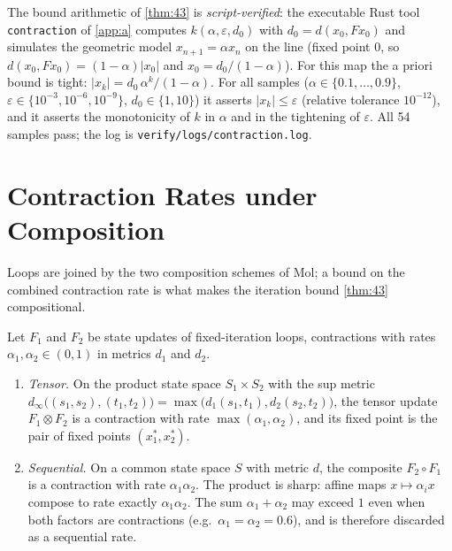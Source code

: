 \begin{remark}\label{rem:thm43-verified}
The bound arithmetic of \autoref{thm:43} is \emph{script-verified}: the executable Rust tool \texttt{contraction} of \autoref{app:a} computes $k (\alpha,\varepsilon,d_0)$ with $d_0 = d (x_0, F x_0)$ and simulates the geometric model $x_{n+1} = \alpha x_n$ on the line (fixed point $0$, so $d (x_0, F x_0) = (1-\alpha) \lvert x_0 \rvert$ and $x_0 = d_0 / (1-\alpha)$). For this map the a priori bound is tight: $\lvert x_k \rvert = d_0\,\alpha^k/(1-\alpha)$. For all samples ($\alpha \in \{0.1,\ldots,0.9\}$, $\varepsilon \in \{10^{-3},10^{-6},10^{-9}\}$, $d_0 \in \{1,10\}$) it asserts $\lvert x_k \rvert \leq \varepsilon$ (relative tolerance $10^{-12}$), and it asserts the monotonicity of $k$ in $\alpha$ and in the tightening of $\varepsilon$. All 54 samples pass; the log is \texttt{verify/logs/contraction.log}.
\end{remark}

\section{Contraction Rates under Composition}\label{sec:trace-compose}

Loops are joined by the two composition schemes of Mol; a bound on the combined contraction rate is what makes the iteration bound \autoref{thm:43} compositional.

\begin{theorem}\label{thm:44}
Let $F_1$ and $F_2$ be state updates of fixed-iteration loops, contractions with rates $\alpha_1,\alpha_2 \in (0,1)$ in metrics $d_1$ and $d_2$.
\begin{enumerate}
\item[(i)] \emph{Tensor.} On the product state space $S_1 \times S_2$ with the sup metric $d_\infty\bigl ((s_1,s_2),(t_1,t_2)\bigr) = \max\bigl (d_1 (s_1,t_1),d_2 (s_2,t_2)\bigr)$, the tensor update $F_1 \otimes F_2$ is a contraction with rate $\max (\alpha_1,\alpha_2)$, and its fixed point is the pair of fixed points $(x_1^{*},x_2^{*})$.
\item[(ii)] \emph{Sequential.} On a common state space $S$ with metric $d$, the composite $F_2 \circ F_1$ is a contraction with rate $\alpha_1\alpha_2$. The product is sharp: affine maps $x \mapsto \alpha_i x$ compose to rate exactly $\alpha_1\alpha_2$. The sum $\alpha_1 + \alpha_2$ may exceed $1$ even when both factors are contractions (e.g.\ $\alpha_1 = \alpha_2 = 0.6$), and is therefore discarded as a sequential rate.
\end{enumerate}
\end{theorem}

